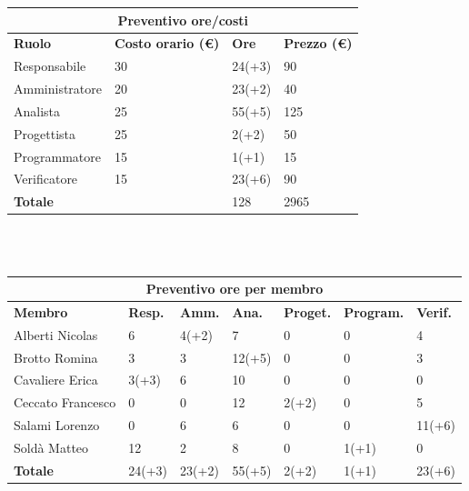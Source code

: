 \documentclass[a4paper, 12pt]{article}
\begin{document}
\begin{center}
	\begin{tabularx}{\textwidth}{|X|X|X|X|}
		\hline
		\multicolumn{4}{|c|}{\textbf{Preventivo ore/costi}}                                      \\
		\hline
		\hline
		\textbf{Ruolo}  & \textbf{Costo orario (\euro)} & \textbf{Ore} & \textbf{Prezzo (\euro)} \\
		\hline
		Responsabile    & 30                            & 24(+3)       & 90                      \\
		\hline
		Amministratore  & 20                            & 23(+2)       & 40                      \\
		\hline
		Analista        & 25                            & 55(+5)       & 125                     \\
		\hline
		Progettista     & 25                            & 2(+2)        & 50                     \\
		\hline
		Programmatore   & 15                            & 1(+1)        & 15                       \\
		\hline
		Verificatore    & 15                            & 23(+6)       & 90                      \\
		\hline
		\hline
		\textbf{Totale} &                               & 128          & 2965                    \\
		\hline
	\end{tabularx}\\[8pt]
	\mbox{}\\
\end{center}

\begin{center}
	\begin{tabularx}{\textwidth}{|X|X|X|X|X|X|X|}
		\hline
		\multicolumn{7}{|c|}{\textbf{Preventivo ore per membro}}                                      \\
		\hline
		\hline
		\textbf{Membro}  & \textbf{Resp.} & \textbf{Amm.} & \textbf{Ana.} &
		\textbf{Proget.} & \textbf{Program.} & \textbf{Verif.} \\
		\hline
		Alberti Nicolas    	&6 	&4(+2)	&7	&0	&0	&4	\\
		\hline
		Brotto Romina    	&3 	&3	&12(+5)	&0	&0	&3	\\
		\hline
		Cavaliere Erica    	&3(+3) 	&6  &10  &0 &0 &0	\\
		\hline
		Ceccato Francesco   &0 	&0  &12  &2(+2) &0 &5	\\
		\hline
		Salami Lorenzo    	&0 	&6  &6 &0 &0 &11(+6)	\\
		\hline
		Soldà Matteo    	&12	&2  &8 &0 &1(+1) &0	\\
		\hline
		\hline
		\textbf{Totale} 	&24(+3) &23(+2) &55(+5) &2(+2) &1(+1) &23(+6)	\\
		\hline
	\end{tabularx}\\[8pt]
	\mbox{}\\
\end{center}
\end{document}
